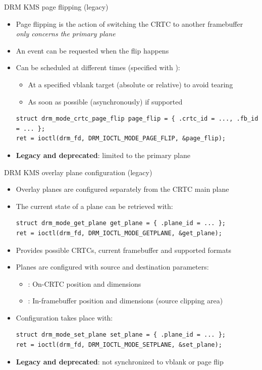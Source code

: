 \begin{frame}[fragile]{DRM KMS page flipping (legacy)}
  \begin{itemize}
  \item Page flipping is the action of switching the CRTC to another framebuffer\\
  \textit{only concerns the primary plane}
  \item An event can be requested when the flip happens
  \item Can be scheduled at different times (specified with ):
    \begin{itemize}
    \item At a specified vblank target (absolute or relative) to avoid tearing
    \item As soon as possible (asynchronously) if supported
    \end{itemize}
  \begin{verbatim}
struct drm_mode_crtc_page_flip page_flip = { .crtc_id = ..., .fb_id = ... };
ret = ioctl(drm_fd, DRM_IOCTL_MODE_PAGE_FLIP, &page_flip);
  \end{verbatim}
  \item \textbf{Legacy and deprecated}: limited to the primary plane
  \end{itemize}
\end{frame}

\begin{frame}[fragile]{DRM KMS overlay plane configuration (legacy)}
  \begin{itemize}
  \item Overlay planes are configured separately from the CRTC main plane
  \item The current state of a plane can be retrieved with:
  \begin{verbatim}
struct drm_mode_get_plane get_plane = { .plane_id = ... };
ret = ioctl(drm_fd, DRM_IOCTL_MODE_GETPLANE, &get_plane);
  \end{verbatim}
  \item Provides possible CRTCs, current framebuffer and supported formats
  \item Planes are configured with source and destination parameters:
    \begin{itemize}
    \item {}: On-CRTC position and dimensions
    \item {}: In-framebuffer position and dimensions (source clipping area)
    \end{itemize}
  \item Configuration takes place with:
  \begin{verbatim}
struct drm_mode_set_plane set_plane = { .plane_id = ... };
ret = ioctl(drm_fd, DRM_IOCTL_MODE_SETPLANE, &set_plane);
  \end{verbatim}
  \item \textbf{Legacy and deprecated}: not synchronized to vblank or page flip
  \end{itemize}
\end{frame}

